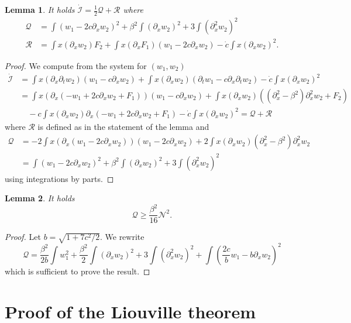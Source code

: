 \documentclass[11pt]{amsart}
\newtheorem{lemma}{Lemma}
\theoremstyle{remark}
\newcommand\cI{\mathcal{I}}
\newcommand\cQ{\mathcal{Q}}
\newcommand\cR{\mathcal{R}}
\newcommand\cN{\mathcal{N}}
\begin{document}
\begin{lemma}\label{le:07}
It holds $\dot{\cI}=\frac12\cQ+ \cR$ where
\begin{align*}
\cQ &= \int (w_1-2c\partial_x w_2)^2+\beta^2\int (\partial_x w_2)^2
+3 \int (\partial_x^2 w_2)^2\\
\cR&=\int x(\partial_x w_2) F_2+\int x (\partial_x F_1) (w_1-2 c \partial_x w_2)-\dot c \int x(\partial_x w_2)^2.
\end{align*}
\end{lemma}
\begin{proof}
We compute from the system for $(w_1,w_2)$
\begin{align*}
\dot{\cI}&=\int x(\partial_{x}\partial_t w_2)(w_1-c\partial_x w_2)+\int x(\partial_x w_2) (\partial_t w_1 -c \partial_{x}\partial_t w_2)-\dot c\int x (\partial_x w_2)^2\\
&=\int x(\partial_x(-w_1+2 c\partial_x w_2+F_1))(w_1-c\partial_x w_2)
+\int x (\partial_x w_2)((\partial_{x}^2-\beta^2)\partial_{x}^2 w_2+F_2)\\
&\quad -c\int x (\partial_x w_2)\partial_x(-w_1+2 c\partial_x w_2 + F_1)-\dot c\int x (\partial_x w_2)^2 = \cQ+\cR
\end{align*}
where $\cR$ is defined as in the statement of the lemma and 
\begin{align*}
\cQ &=-2\int x(\partial_x(w_1-2 c\partial_x w_2)) (w_1-2c\partial_x w_2)
+2\int x(\partial_x w_2)(\partial_{x}^2-\beta^2)\partial_{x}^2 w_2\\
&= \int (w_1-2c\partial_x w_2)^2+\beta^2\int (\partial_x w_2)^2+3 \int (\partial_x^2 w_2)^2
\end{align*}
using integrations by parts.
\end{proof}

\begin{lemma}\label{le:08}
It holds
\[
\cQ \geq \frac {\beta^2}{16} \cN^2.
\]
\end{lemma}
\begin{proof}
Let $b=\sqrt{1+7c^2/2}$.
We rewrite
\begin{equation*}
\cQ = \frac{\beta^2}{2b} \int w_1^2 + \frac{\beta^2}{2} \int (\partial_x w_2)^2
+ 3\int (\partial_x^2 w_2)^2
 + \int \left( \frac{2c}{b} w_1 - b \partial_x w_2\right)^2
\end{equation*}
which is sufficient to prove the result.
\end{proof}
\section{Proof of the Liouville theorem}
\end{document}
